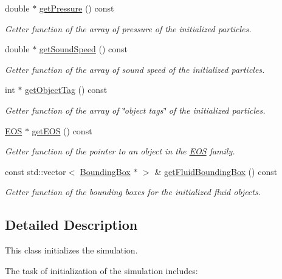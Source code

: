 \begin{DoxyCompactItemize}
double $\ast$ \hyperlink{classInitializer_aa20c070f47fbef85698018de12a73861}{get\-Pressure} () const 
\begin{DoxyCompactList}\small\item\em Getter function of the array of pressure of the initialized particles. \end{DoxyCompactList}\item 
double $\ast$ \hyperlink{classInitializer_a2fc7adb85eb243906fc756b4f124ebef}{get\-Sound\-Speed} () const 
\begin{DoxyCompactList}\small\item\em Getter function of the array of sound speed of the initialized particles. \end{DoxyCompactList}\item 
int $\ast$ \hyperlink{classInitializer_a8f419c10688793258e1359ea25683bca}{get\-Object\-Tag} () const 
\begin{DoxyCompactList}\small\item\em Getter function of the array of \char`\"{}object tags\char`\"{} of the initialized particles. \end{DoxyCompactList}\item 
\hyperlink{classEOS}{E\-O\-S} $\ast$ \hyperlink{classInitializer_a20859e6765c50a0173b7f164c1962e6f}{get\-E\-O\-S} () const 
\begin{DoxyCompactList}\small\item\em Getter function of the pointer to an object in the \hyperlink{classEOS}{E\-O\-S} family. \end{DoxyCompactList}\item 
const std\-::vector$<$ \hyperlink{classBoundingBox}{Bounding\-Box} $\ast$ $>$ \& \hyperlink{classInitializer_ac7822b9561a21c40809738236b10bb91}{get\-Fluid\-Bounding\-Box} () const 
\begin{DoxyCompactList}\small\item\em Getter function of the bounding boxes for the initialized fluid objects. \end{DoxyCompactList}\end{DoxyCompactItemize}


\subsection{Detailed Description}
This class initializes the simulation. 

The task of initialization of the simulation includes\-:\par


